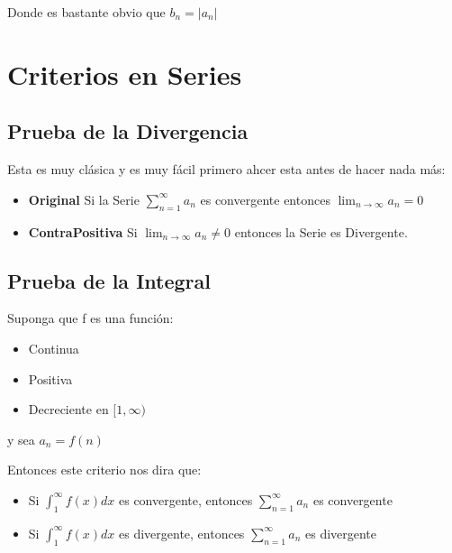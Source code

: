 \documentclass[12pt]{report}							    %
\begin{document}
        Donde es bastante obvio que $b_n = |a_n|$



\clearpage
\chapter{Criterios en Series}

    \clearpage
    \section{Prueba de la Divergencia}
    Esta es muy clásica y es muy fácil primero ahcer esta antes
    de hacer nada más:

    \begin{itemize}
        \item \textbf{Original} Si la Serie $\sum_{n=1}^{\infty} a_n$ es
        convergente entonces $\lim_{n \to \infty} a_n = 0$

        \item \textbf{ContraPositiva} Si $\lim_{n \to \infty} a_n \neq 0$ entonces la Serie es Divergente.
    \end{itemize}

    \clearpage
    \section{Prueba de la Integral}
    Suponga que f es una función:

    \begin{itemize}
        \item Continua
        \item Positiva
        \item Decreciente en $[1, \infty)$
    \end{itemize}

    y sea $a_n = f(n)$

    Entonces este criterio nos dira que:
    \begin{itemize}
       \item Si $\int _1^{\infty}f(x) dx$ es convergente, entonces $\sum_{n=1}^{\infty} a_n$ es convergente
       \item Si $\int _1^{\infty}f(x) dx$ es divergente, entonces $\sum_{n=1}^{\infty} a_n$ es divergente
    \end{itemize}
\end{document}
